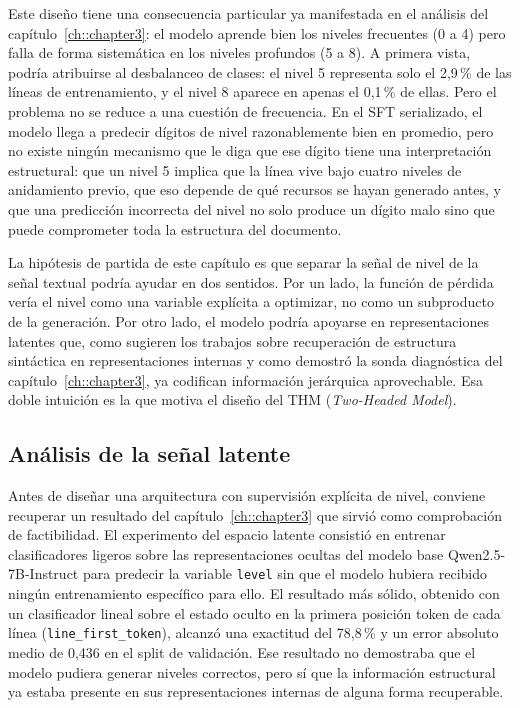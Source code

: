 Este diseño tiene una consecuencia particular ya manifestada en el análisis del capítulo~\ref{ch::chapter3}: el modelo aprende bien los niveles frecuentes (0 a 4)
pero falla de forma sistemática en los niveles profundos (5 a 8). A primera vista, podría atribuirse al desbalanceo de clases: el nivel 5 representa solo el 2,9\,\% de las líneas de
entrenamiento, y el nivel 8 aparece en apenas el 0,1\,\% de ellas. Pero el problema no se reduce a una cuestión de frecuencia. En el SFT serializado, el modelo llega a predecir
dígitos de nivel razonablemente bien en promedio, pero no existe ningún mecanismo que le diga que ese dígito tiene una interpretación estructural: que un nivel 5 implica que la
línea vive bajo cuatro niveles de anidamiento previo, que eso depende de qué recursos se hayan generado antes, y que una predicción incorrecta del nivel no solo produce un dígito
malo sino que puede comprometer toda la estructura del documento.

La hipótesis de partida de este capítulo es que separar la señal de nivel de la señal textual podría ayudar en dos sentidos. Por un lado, la función de pérdida vería el nivel
como una variable explícita a optimizar, no como un subproducto de la generación. Por otro lado, el modelo podría apoyarse en representaciones latentes que, como sugieren los trabajos sobre recuperación de estructura sintáctica en representaciones internas \citep{hewitt2019structural, clark2019bert} y como demostró la sonda
diagnóstica del capítulo~\ref{ch::chapter3}, ya codifican información jerárquica aprovechable. Esa doble intuición es la que motiva el diseño del THM (\textit{Two-Headed Model}).


\subsection{Análisis de la señal latente}
\label{sec:ch6_latent_probe}

Antes de diseñar una arquitectura con supervisión explícita de nivel, conviene recuperar un resultado del capítulo~\ref{ch::chapter3} que sirvió como comprobación de factibilidad.
El experimento del espacio latente consistió en entrenar clasificadores ligeros sobre las representaciones ocultas del modelo base Qwen2.5-7B-Instruct para predecir la variable
\texttt{level} sin que el modelo hubiera recibido ningún entrenamiento específico para ello. El resultado más sólido, obtenido con un clasificador lineal sobre el estado oculto
en la primera posición token de cada línea (\texttt{line\_first\_token}), alcanzó una exactitud del 78,8\,\% y un error absoluto medio de 0,436 en el split de validación. Ese
resultado no demostraba que el modelo pudiera generar niveles correctos, pero sí que la información estructural ya estaba presente en sus representaciones internas de alguna
forma recuperable.

